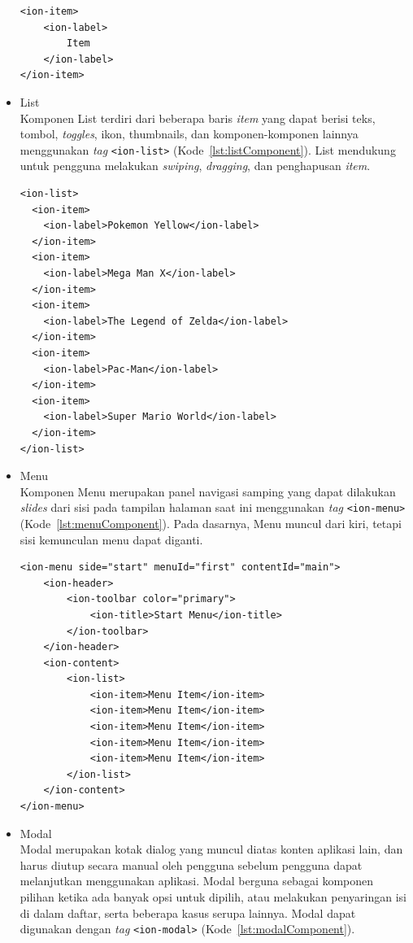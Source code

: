 \begin{itemize}
\begin{lstlisting}[label={lst:itemComponent}, caption=Potongan Kode Program dari Item Component]
<ion-item>
	<ion-label>
		Item
	</ion-label>
</ion-item>
\end{lstlisting} 
	\newpage
	\item List \\
	Komponen List terdiri dari beberapa baris \textit{item} yang dapat berisi teks, tombol, \textit{toggles}, ikon, thumbnails, dan komponen-komponen lainnya menggunakan \textit{tag} \texttt{<ion-list>} (Kode~\ref{lst:listComponent}). List mendukung untuk pengguna melakukan \textit{swiping}, \textit{dragging}, dan penghapusan \textit{item}. 
	
\begin{lstlisting}[label={lst:listComponent}, caption=Potongan Kode Program dari List Component]
<ion-list>
  <ion-item>
    <ion-label>Pokemon Yellow</ion-label>
  </ion-item>
  <ion-item>
    <ion-label>Mega Man X</ion-label>
  </ion-item>
  <ion-item>
    <ion-label>The Legend of Zelda</ion-label>
  </ion-item>
  <ion-item>
    <ion-label>Pac-Man</ion-label>
  </ion-item>
  <ion-item>
    <ion-label>Super Mario World</ion-label>
  </ion-item>
</ion-list>
\end{lstlisting} 		
	
	\item Menu \\
	Komponen Menu merupakan panel navigasi samping yang dapat dilakukan {\it slides} dari sisi pada tampilan halaman saat ini menggunakan {\it tag} \texttt{<ion-menu>} (Kode~\ref{lst:menuComponent}). Pada dasarnya, Menu muncul dari kiri, tetapi sisi kemunculan menu dapat diganti. 

\begin{lstlisting}[label={lst:menuComponent}, caption=Potongan Kode Program dari Menu Component]
<ion-menu side="start" menuId="first" contentId="main">
	<ion-header>
		<ion-toolbar color="primary">
			<ion-title>Start Menu</ion-title>
		</ion-toolbar>
	</ion-header>
	<ion-content>
		<ion-list>
			<ion-item>Menu Item</ion-item>
			<ion-item>Menu Item</ion-item>
			<ion-item>Menu Item</ion-item>
			<ion-item>Menu Item</ion-item>
			<ion-item>Menu Item</ion-item>
		</ion-list>
	</ion-content>
</ion-menu>
\end{lstlisting} 
	\item Modal \\
	Modal merupakan kotak dialog yang muncul diatas konten aplikasi lain, dan harus diutup secara manual oleh pengguna sebelum pengguna dapat melanjutkan menggunakan aplikasi. Modal berguna sebagai komponen pilihan ketika ada banyak opsi untuk dipilih, atau melakukan penyaringan isi di dalam daftar, serta beberapa kasus serupa lainnya. Modal dapat digunakan dengan \textit{tag} \texttt{<ion-modal>} (Kode~\ref{lst:modalComponent}).


\end{itemize}
